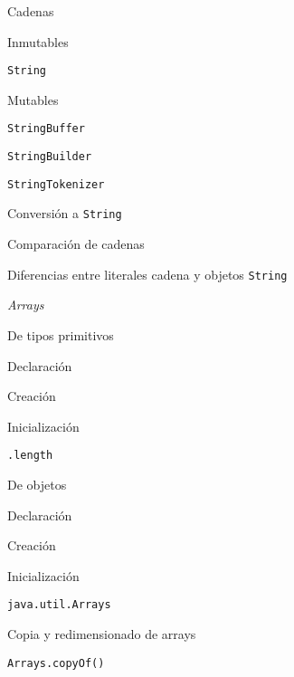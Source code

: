 \begin{longenum}
\begin{longenum}
        \item Cadenas
        \begin{longenum}
            \item Inmutables
            \begin{longenum}
                \item \texttt{String}
            \end{longenum}
            \item Mutables
            \begin{longenum}
                \item \texttt{StringBuffer}
                \item \texttt{StringBuilder}
                \item \texttt{StringTokenizer}
            \end{longenum}
            \item Conversión a \texttt{String}
            \item Comparación de cadenas
            \item Diferencias entre literales cadena y objetos \texttt{String}
        \end{longenum}
        \item \textit{Arrays}
        \begin{longenum}
            \item De tipos primitivos
            \begin{longenum}
                \item Declaración
                \item Creación
                \item Inicialización
            \end{longenum}
            \item \texttt{.length}
            \item De objetos
            \begin{longenum}
                \item Declaración
                \item Creación
                \item Inicialización
            \end{longenum}
            \item \texttt{java.util.Arrays}
            \item Copia y redimensionado de arrays
            \begin{longenum}
                \item \texttt{Arrays.copyOf()}

\end{longenum}
\end{longenum}
\end{longenum}
\end{longenum}

